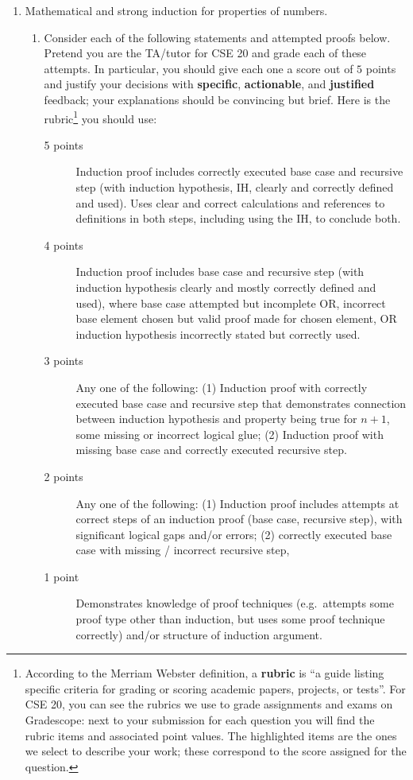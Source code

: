 \begin{enumerate}[labelindent=0pt, leftmargin=0pt]
    \item Mathematical and strong induction for properties of numbers.

    \begin{enumerate}
    \item \gradeCompleteFirst    Consider each of the following statements and attempted proofs below. Pretend you are the TA/tutor for CSE 20 and grade each of these attempts. 
    In particular, you should give each one a score out of $5$ points and justify your decisions with {\bf specific}, 
    {\bf actionable}, and {\bf justified} feedback;
    your explanations should be convincing but brief.
    Here is the rubric\footnote{According to the Merriam Webster definition, a {\bf rubric} is ``a guide listing specific criteria for grading or scoring academic papers, projects, or tests''. For CSE 20, you can see the rubrics 
    we use to grade assignments and exams on Gradescope: next to your submission for each question you will
    find the rubric items and associated point values. The highlighted items are the ones we select
    to describe your work; these correspond to the score assigned for the question.} you should use: 
    \begin{description}
    \item[5 points] Induction proof includes correctly executed base case
     and recursive step (with induction hypothesis, IH, clearly and correctly defined and used). Uses clear and correct calculations and references to definitions in both steps, including using the IH, to conclude both.
    \item[4 points] Induction proof includes base case and recursive step (with induction hypothesis clearly and mostly correctly defined and used),
    where base case attempted but incomplete OR, incorrect base element chosen but valid proof made for chosen
    element, OR induction hypothesis incorrectly stated but correctly used.
    \item[3 points] Any one of the following: (1) Induction proof with correctly executed base case 
    and recursive step that demonstrates
    connection between induction hypothesis and property being true for $n+1$, some missing or 
    incorrect logical glue; (2) Induction proof with missing base case and correctly executed recursive step.
    \item[2 points] Any one of the following: (1) Induction proof includes attempts at correct steps of an 
    induction proof (base case, recursive  step), with significant logical gaps and/or errors; (2) correctly executed base case 
    with missing / incorrect recursive step,
    \item[1 point] Demonstrates knowledge of proof techniques (e.g.\ attempts some proof type other than 
    induction, but uses some proof technique correctly) and/or structure of induction argument.
    \end{description}
    

\end{enumerate}
\end{enumerate}
